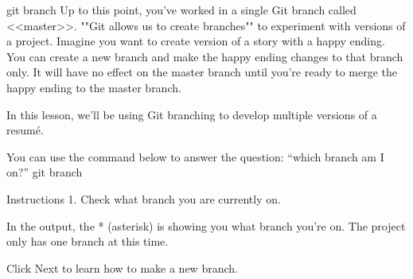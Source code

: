 git branch
    Up to this point, you’ve worked in a single Git branch called <<master>>. ""Git allows us to create branches"" to experiment with versions of a project. Imagine you want to create version of a story with a happy ending. You can create a new branch and make the happy ending changes to that branch only. It will have no effect on the master branch until you’re ready to merge the happy ending to the master branch.

    In this lesson, we’ll be using Git branching to develop multiple versions of a resumé.

    You can use the command below to answer the question: “which branch am I on?”
        git branch

Instructions
1.
    Check what branch you are currently on.

    In the output, the * (asterisk) is showing you what branch you’re on. The project only has one branch at this time.

    Click Next to learn how to make a new branch.